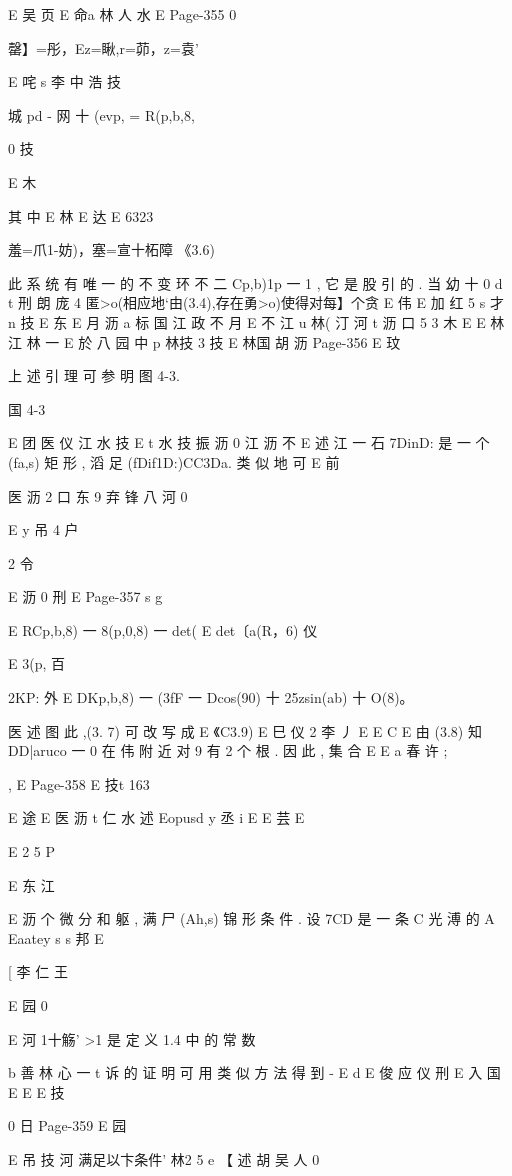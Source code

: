 {{{{{{{{{{{{{{{{{{{E 吴 页
E 命a 林 人 水
E
Page-355
0

罄】=彤，Ez=瞅,r=茆，z=袁'

E 咤 s 李 中 浩 技

城 pd - 网 十 (evp, = R(p,b,8,

0 技

E 木

其 中
E 林
E 达
E 6323

羞=爪1-妨)，塞=宣十柘障 《3.6)

此 系 统 有 唯 一 的 不 变 环 不 二 {Cp,b)1p 一 1} , 它 是 股 引 的 . 当 幼 十
0 d t 刑 朗 庞
4
匿>o(相应地`由(3.4),存在勇>o)使得对每】个贪 E 伟
E 加 红 5 s 才
n 技
E 东
E 月 沥
a 标 国 江 政 不 月
E 不 江 u 林( 汀 河
t 沥 口 5 3 木
E
E 林 江 林 一
E 於 八 园 中 p 林技 3 技
E 林国 胡
沥
Page-356
E 玟

上 述 引 理 可 参 明 图 4-3.

国 4-3

E 团 医 仪 江 水 技
E t 水 技 振 沥
0
江
沥 不
E 述 江 一 石
7DinD: 是 一 个 (fa,s) 矩 形 , 滔 足 (fDif1D:)CC3Da. 类 似 地 可
E 前

医 沥 2 口 东 9 弃 锋 八 河
0

E y 吊 4 户

2
令

E 沥 0 刑
E
Page-357
s g

E
RCp,b,8) 一 8(p,0,8) 一 det(
E
det〔a(R，6) 仪

E
3(p, 百

2KP: 外
E
DKp,b,8) 一 (3fF 一 Dcos(90) 十 25zsin(ab) 十 O(8)。

医 述
图 此 ,(3. 7) 可 改 写 成
E 《C3.9)
E
巳 仪 2 李 丿
E
E
C
E
由 (3.8) 知 DD|aruco 一 0 在 伟 附 近 对 9 有 2 个 根 . 因 此 , 集 合
E E a 春 许 ;

, E
Page-358
E 技t 163

E 途
E
医 沥 t 仁 水 述
Eopusd y 丞 i
E
E
芸 E

E
2 5
P

E 东 江

E 沥
个 微 分 和 躯 , 满 尸 (Ah,s) 锦 形 条 件 . 设 7CD 是 一 条 C 光 溥 的 A
Eaatey s s 邦
E

[ 李 仁 王

E 园 0

E 河 1十觞'
>1 是 定 义 1.4 中 的 常 数

b 善 林 心 一 t
诉 的 证 明 可 用 类 似 方 法 得 到 -
E
d
E 俊 应 仪
刑
E
入
国 E
E
E 技

0 日
Page-359
E 园

E 吊 技 河 满足以卞条件'
林2
5
e
【 述 胡 吴 人 0

}}}}}}}}}}}}}}}}}}}
